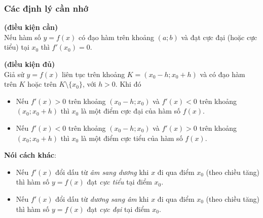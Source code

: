 \subsubsection{Các định lý cần nhớ}%
\begin{dl} \textbf{(điều kiện cần)}\\
    Nếu hàm số $y=f(x)$ có đạo hàm trên khoảng $(a;b)$ và đạt cực đại (hoặc cực tiểu) tại $x_0$ thì $f'(x_0)=0$.
\end{dl}
\begin{dl}\textbf{(điều kiện đủ)}\\
    Giả sử $y=f(x)$ liên tục trên khoảng $K=(x_0-h;x_0+h)$ và có đạo hàm trên $K$ hoặc trên $K\setminus \{x_0\}$, với $h>0$. Khi đó
    \begin{itemize}
        \item Nếu $f'(x)>0$ trên khoảng $(x_0-h;x_0)$ và $f'(x)<0$ trên khoảng $(x_0;x_0+h)$ thì $x_0$ là một điểm cực đại của hàm số $f(x)$.
        \item Nếu $f'(x)<0$ trên khoảng $(x_0-h;x_0)$ và $f'(x)>0$ trên khoảng $(x_0;x_0+h)$ thì $x_0$ là một điểm cực tiểu của hàm số $f(x)$.
    \end{itemize}
    \begin{center}
        \begin{minipage}[b]{8cm}
        \end{minipage}
        \begin{minipage}[b]{8cm}
        \end{minipage}
    \end{center}
    \textbf{Nói cách khác}:
    \begin{itemize}
        \item Nếu $f'(x)$ đổi dấu từ \textit{âm sang dương} khi $x$ đi qua điểm $x_0$ (theo chiều tăng) thì hàm số $y=f(x)$ đạt \textit{cực tiểu} tại điểm $x_0$.
        \item Nếu $f'(x)$ đổi dấu từ \textit{dương sang âm} khi $x$ đi qua điểm $x_0$ (theo chiều tăng) thì hàm số $y=f(x)$ đạt \textit{cực đại} tại điểm $x_0$.
    \end{itemize}
\end{dl}
